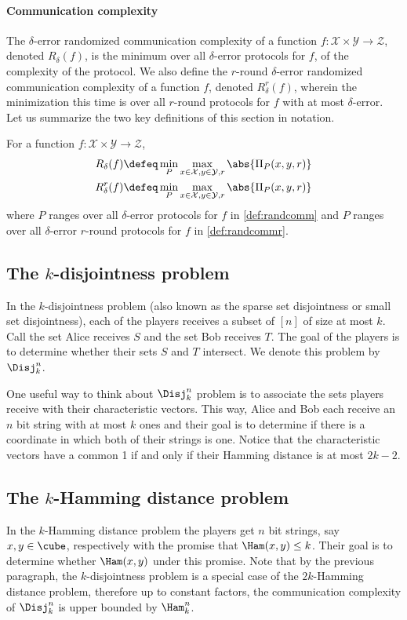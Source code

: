 \paragraph{Communication complexity}
The $\delta$-error randomized communication complexity of a
function $f\colon\mathcal{X}\times\mathcal{Y}\to\mathcal{Z}$,
denoted $R_\delta(f)$, is the minimum over all $\delta$-error
protocols for $f$, of the complexity of the protocol. We also
define the $r$-round $\delta$-error randomized communication
complexity of a function $f$, denoted $R^r_\delta(f)$, wherein
the minimization this time is over all $r$-round protocols for
$f$ with at most $\delta$-error. Let us summarize the 
two key definitions of this section in notation.

For a function 
$f\colon\mathcal{X}\times\mathcal{Y}\to\mathcal{Z}$,
\begin{align}
R_\delta(f) &\defeq 
  \min_{P}\max_{x\in\mathcal{X},y\in\mathcal{Y},r} \abs{\Pi_P(x,y,r)}
  \label{def:randcomm}\\
%
R^r_\delta(f) &\defeq
  \min_{P}\max_{x\in\mathcal{X},y\in\mathcal{Y},r} \abs{\Pi_P(x,y,r)}
  \label{def:randcommr}
\end{align}
where $P$ ranges over all $\delta$-error protocols for $f$ in \autoref{def:randcomm}
and $P$ ranges over all $\delta$-error $r$-round protocols for $f$ in \autoref{def:randcommr}.

\subsection{The $k$-disjointness problem}
In the $k$-disjointness problem (also known as the sparse set
disjointness or small set disjointness), each of the players
receives a subset of $[n]$ of size at most $k$. Call the set
Alice receives $S$ and the set Bob receives $T$. The goal of the
players is to determine whether their sets $S$ and $T$ intersect.
We denote this problem by $\Disj^n_k$.

One useful way to think about $\Disj^n_k$ problem is to associate 
the sets players receive with their characteristic vectors. This way,
Alice and Bob each receive an $n$ bit string with at most $k$ ones
and their goal is to determine if there is a coordinate in which
both of their strings is one. Notice that the characteristic vectors
have a common 1 if and only if their Hamming distance is at most $2k-2$.

\subsection{The $k$-Hamming distance problem}
In the $k$-Hamming distance problem the players get $n$ bit strings,
say $x,y\in\cube$, respectively with the promise that $\Ham(x,y)\le k$.
Their goal is to determine whether $\Ham(x,y)$ under this promise.
Note that by the previous paragraph, the $k$-disjointness problem
is a special case of the $2k$-Hamming distance problem, therefore
up to constant factors, the communication complexity of
$\Disj^n_k$ is upper bounded by $\Ham^n_k$.